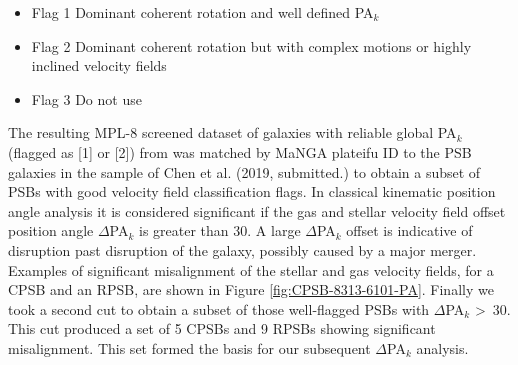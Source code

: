 \begin{itemize}
    \item {Flag 1}  Dominant coherent rotation and well defined PA$_{k}$
    \item {Flag 2}  Dominant coherent rotation but with complex motions or highly inclined velocity fields 
    \item {Flag 3}  Do not use
\end{itemize}

The resulting MPL-8 screened dataset of galaxies with reliable global PA$_{k}$ (flagged as [1] or [2]) from \cite{2019MNRAS.483..172D} was matched by MaNGA plateifu ID to the PSB galaxies in the sample of Chen et al. (2019, submitted.) to obtain a subset of PSBs with good velocity field classification flags. 
In classical kinematic position angle analysis it is considered significant if the gas and stellar velocity field offset position angle $\Delta$PA$_{k}$ is greater than 30\textdegree. A large $\Delta$PA$_{k}$ offset is indicative of disruption past disruption of the galaxy, possibly caused by a major merger. Examples of significant misalignment of the stellar and gas velocity fields, for a CPSB and an RPSB, are shown in Figure \ref{fig:CPSB-8313-6101-PA}. Finally we took a second cut to obtain a subset of those well-flagged PSBs with $\Delta$PA$_{k}$ \textgreater\ 30\textdegree. This cut produced a set of 5 CPSBs and 9 RPSBs showing significant misalignment. This set formed the basis for our subsequent $\Delta$PA$_{k}$ analysis.

